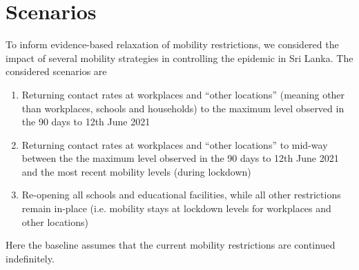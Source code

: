 \section{Scenarios}
To inform evidence-based relaxation of mobility restrictions, we considered the impact of several mobility strategies in controlling the epidemic in Sri Lanka. The considered scenarios are
\begin{enumerate}
	\item Returning contact rates at workplaces and ``other locations'' (meaning other than workplaces, schools and households) to the maximum level observed in the 90 days to 12th June 2021
	\item  Returning contact rates at workplaces and ``other locations'' to mid-way between the the maximum level observed in the 90 days to 12th June 2021 and the most recent mobility levels (during lockdown)
	\item Re-opening all schools and educational facilities, while all other restrictions remain in-place (i.e. mobility stays at lockdown levels for workplaces and other locations)
\end{enumerate}

Here the baseline assumes that the current mobility restrictions are continued indefinitely.